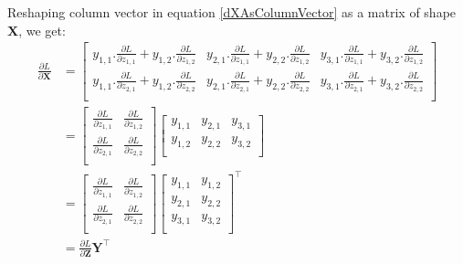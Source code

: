 \documentclass{article}
\newcommand{\transpose}[1]{#1^\top}
\newcommand{\matr}[1]{\mathbf{#1}} %
\begin{document}
Reshaping column vector in equation \ref{dXAsColumnVector} as a matrix of shape $\matr{X}$, we get:
\begin{align}
\frac{\partial L}{\partial \matr{X}} &=
\begin{bmatrix}
y_{1,1}.\frac{\partial L}{\partial z_{1,1}} + y_{1,2}.\frac{\partial L}{\partial z_{1,2}} &
y_{2,1}.\frac{\partial L}{\partial z_{1,1}} + y_{2,2}.\frac{\partial L}{\partial z_{1,2}} &
y_{3,1}.\frac{\partial L}{\partial z_{1,1}} + y_{3,2}.\frac{\partial L}{\partial z_{1,2}} \\[0.7em]
y_{1,1}.\frac{\partial L}{\partial z_{2,1}} + y_{1,2}.\frac{\partial L}{\partial z_{2,2}} &
y_{2,1}.\frac{\partial L}{\partial z_{2,1}} + y_{2,2}.\frac{\partial L}{\partial z_{2,2}} &
y_{3,1}.\frac{\partial L}{\partial z_{2,1}} + y_{3,2}.\frac{\partial L}{\partial z_{2,2}} \\[0.7em]
\end{bmatrix}
\nonumber \\ 
&=
\begin{bmatrix}
\frac{\partial L}{\partial z_{1,1}} & \frac{\partial L}{\partial z_{1,2}} \\[0.7em]
\frac{\partial L}{\partial z_{2,1}} & \frac{\partial L}{\partial z_{2,2}} \\[0.7em]
\end{bmatrix}
\begin{bmatrix}
y_{1,1} & y_{2,1} & y_{3,1} \\%
y_{1,2} & y_{2,2} & y_{3,2} \\%
\end{bmatrix}
\nonumber \\
&=
\begin{bmatrix}
\frac{\partial L}{\partial z_{1,1}} & \frac{\partial L}{\partial z_{1,2}} \\[0.7em]
\frac{\partial L}{\partial z_{2,1}} & \frac{\partial L}{\partial z_{2,2}} \\[0.7em]
\end{bmatrix}
\transpose{\begin{bmatrix}
y_{1,1} & y_{1,2} \\%
y_{2,1} & y_{2,2} \\%
y_{3,1} & y_{3,2} \\%
\end{bmatrix}}
\nonumber \\ \label{dXFinal}
&= \frac{\partial L}{\partial \matr{Z}} \transpose{\matr{Y}}
\end{align}
\end{document}
